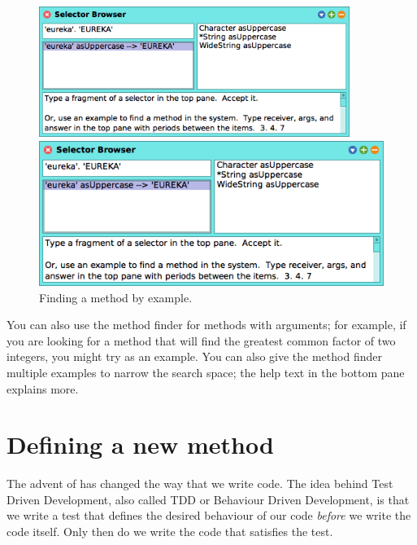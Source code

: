 \documentclass[a4paper,10pt,twoside]{book}
\begin{document}
\begin{figure}[hbt]
\ifluluelse
	{\centerline {\includegraphics[width=0.9\textwidth]{MethodFinder-example1}}}
	{\centerline {\includegraphics[scale=0.7]{MethodFinder-example1}}}
\caption{Finding a method by example.
\label{fig:methodFinder-example1}}
\end{figure}

You can also use the method finder for methods with arguments; for example, if you are looking for a method that will find the greatest common factor of two integers, you might try  as an example.  You can also give the method finder multiple examples to narrow the search space; the help text in the bottom pane explains more.

\section{Defining a new method}

The advent of \cite{Beck03a} has changed the way that we write code.  
The idea behind Test Driven Development, also called TDD or Behaviour Driven Development, is that we write a test that defines the desired behaviour of our code \emph{before} we write the code itself.
Only then do we write the code that satisfies the test.
\end{document}
